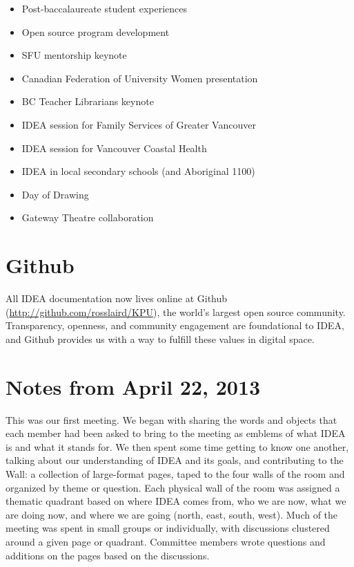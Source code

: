 \documentclass[letterpaper,10pt,headsepline]{scrreprt}
\begin{document}
\begin{itemize}
\itemsep1pt\parskip0pt
\item
  Post-baccalaureate student experiences
\item Open source program development
\item
  SFU mentorship keynote
\item
  Canadian Federation of University Women presentation
\item
  BC Teacher Librarians keynote
\item
  IDEA session for Family Services of Greater Vancouver
\item
  IDEA session for Vancouver Coastal Health
\item
  IDEA in local secondary schools (and Aboriginal 1100)
\item
  Day of Drawing
\item
  Gateway Theatre collaboration
\end{itemize}

\section{Github}

All IDEA documentation now lives online at Github (\url{http://github.com/rosslaird/KPU}), the world's largest open source community. Transparency, openness, and community engagement are foundational to IDEA, and Github provides us with a way to fulfill these values in digital space. 

\section{Notes from April 22, 2013}

This was our first meeting. We began with sharing the words and objects
that each member had been asked to bring to the meeting as emblems of
what IDEA is and what it stands for. We then spent some time getting to
know one another, talking about our understanding of IDEA and its goals,
and contributing to the Wall: a collection of large-format pages, taped
to the four walls of the room and organized by theme or question. Each
physical wall of the room was assigned a thematic quadrant based on
where IDEA comes from, who we are now, what we are doing now, and where
we are going (north, east, south, west). Much of the meeting was spent
in small groups or individually, with discussions clustered around a
given page or quadrant. Committee members wrote questions and additions
on the pages based on the discussions.
\end{document}
